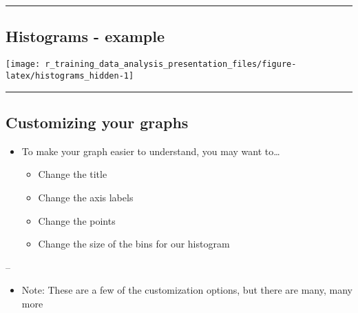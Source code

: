 \documentclass[]{article}
\newenvironment{Shaded}{\begin{snugshade}}{\end{snugshade}}
\newcommand{\KeywordTok}[1]{\textcolor[rgb]{0.13,0.29,0.53}{\textbf{#1}}}
\newcommand{\NormalTok}[1]{#1}
\newcommand{\OperatorTok}[1]{\textcolor[rgb]{0.81,0.36,0.00}{\textbf{#1}}}
\providecommand{\tightlist}{%
  \setlength{\itemsep}{0pt}\setlength{\parskip}{0pt}}
\begin{document}
\begin{Shaded}
\end{Shaded}

\begin{center}\rule{0.5\linewidth}{\linethickness}\end{center}

\hypertarget{histograms---example-1}{%
\subsection{Histograms - example}\label{histograms---example-1}}

\begin{center}\texttt{[image: r\_training\_data\_analysis\_presentation\_files/figure-latex/histograms\_hidden-1]} \end{center}

\begin{center}\rule{0.5\linewidth}{\linethickness}\end{center}

\hypertarget{customizing-your-graphs}{%
\subsection{Customizing your graphs}\label{customizing-your-graphs}}

\begin{itemize}
\tightlist
\item
  To make your graph easier to understand, you may want to\ldots{}

  \begin{itemize}
  \tightlist
  \item
    Change the title
  \item
    Change the axis labels
  \item
    Change the points
  \item
    Change the size of the bins for our histogram
  \end{itemize}
\end{itemize}

--

\begin{itemize}
\tightlist
\item
  Note: These are a few of the customization options, but there are
  many, many more
\end{itemize}
\end{document}
